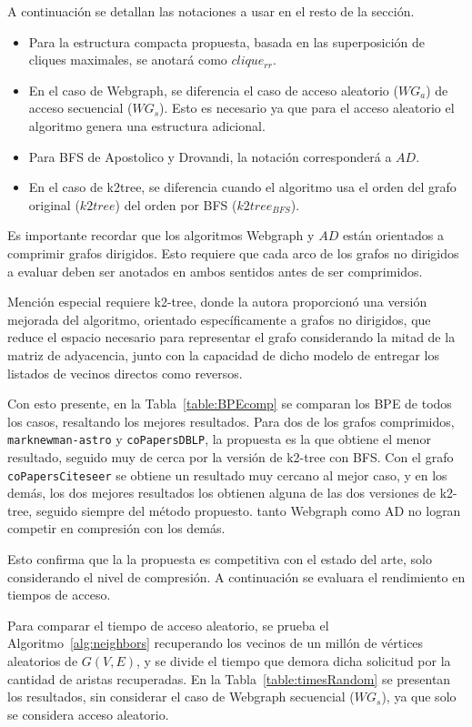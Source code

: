 A continuación se detallan las notaciones a usar en el resto de la sección.

\begin{itemize}
	\item Para la estructura compacta propuesta, basada en las superposición de cliques maximales, se anotará como $clique_{rr}$.
	\item En el caso de Webgraph, se diferencia el caso de acceso aleatorio ($WG_{a}$) de acceso secuencial ($WG_{s}$). Esto es necesario ya que para el acceso aleatorio el algoritmo genera una estructura adicional.
	\item Para BFS de Apostolico y Drovandi, la notación corresponderá a $AD$.
	\item En el caso de k2tree, se diferencia cuando el algoritmo usa el orden del grafo original ($k2tree$) del orden por BFS ($k2tree_{BFS}$).
\end{itemize}

Es importante recordar que los algoritmos Webgraph y $AD$ están orientados a comprimir grafos dirigidos. Esto requiere que cada arco de los grafos no dirigidos a evaluar deben ser anotados en ambos sentidos antes de ser comprimidos. 

Mención especial requiere k2-tree, donde la autora proporcionó una versión mejorada del algoritmo, orientado específicamente a grafos no dirigidos, que reduce el espacio necesario para representar el grafo considerando la mitad de la matriz de adyacencia, junto con la capacidad de dicho modelo de entregar los listados de vecinos directos como reversos.

Con esto presente, en la Tabla~\ref{table:BPEcomp} se comparan los BPE de todos los casos, resaltando los mejores resultados. Para dos de los grafos comprimidos, \texttt{marknewman-astro} y \texttt{coPapersDBLP}, la propuesta es la que obtiene el menor resultado, seguido muy de cerca por la versión de k2-tree con BFS. Con el grafo \texttt{coPapersCiteseer} se obtiene un resultado muy cercano al mejor caso, y en los demás, los dos mejores resultados los obtienen alguna de las dos versiones de k2-tree, seguido siempre del método propuesto. tanto Webgraph como AD no logran competir en compresión con los demás.

Esto confirma que la la propuesta es competitiva con el estado del arte, solo considerando el nivel de compresión. A continuación se evaluara el rendimiento en tiempos de acceso.



Para comparar el tiempo de acceso aleatorio, se prueba el Algoritmo~\ref{alg:neighbors} recuperando los vecinos de un millón de vértices aleatorios de $G(V, E)$, y se divide el tiempo que demora dicha solicitud por la cantidad de aristas recuperadas. En la Tabla~\ref{table:timesRandom} se presentan los resultados, sin considerar el caso de Webgraph secuencial ($WG_{s}$), ya que solo se considera acceso aleatorio. 

